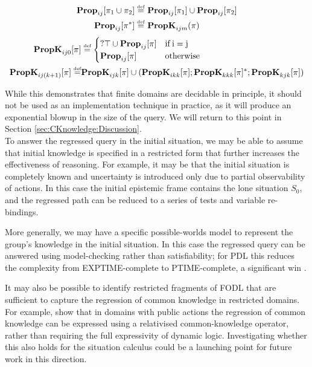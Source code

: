 \begin{align*}
\mathbf{Prop}_{ij}[\pi_{1}\cup\pi_{2}]\stackrel{\mbox{\tiny def}}{=} & \,\,\mathbf{Prop}_{ij}[\pi_{1}]\cup\mathbf{Prop}_{ij}[\pi_{2}]\\
\mathbf{Prop}_{ij}[\pi^{*}]\stackrel{\mbox{\tiny def}}{=} & \,\,\mathbf{PropK}_{ijm}(\pi)\end{align*}
\begin{align*}
\mathbf{PropK}_{ij0}[\pi] & \stackrel{\mbox{\tiny def}}{=}\begin{cases}
?\top\cup\mathbf{Prop}_{ij}[\pi] & \mathrm{if\, i=j}\\
\mathbf{Prop}_{ij}[\pi] & \mathrm{otherwise}\end{cases}\\
\mathbf{PropK}_{ij(k+1)}[\pi]\stackrel{\mbox{\tiny def}}{=} & \mathbf{PropK}_{ijk}[\pi]\cup(\mathbf{PropK}_{ikk}[\pi];\mathbf{PropK}_{kkk}[\pi]^{*};\mathbf{PropK}_{kjk}[\pi])\end{align*}


While this demonstrates that finite domains are decidable in principle,
it should not be used as an implementation technique in practice,
as it will produce an exponential blowup in the size of the query.
We will return to this point in Section \ref{sec:CKnowledge:Discussion}.\\


To answer the regressed query in the initial situation, we may be
able to assume that initial knowledge is specified in a restricted
form that further increases the effectiveness of reasoning. For example,
it may be that the initial situation is completely known and uncertainty
is introduced only due to partial observability of actions. In this
case the initial epistemic frame contains the lone situation $S_{0}$,
and the regressed path can be reduced to a series of tests and variable
re-bindings.

More generally, we may have a specific possible-worlds model to represent
the group's knowledge in the initial situation. In this case the regressed
query can be answered using model-checking rather than satisfiability;
for PDL this reduces the complexity from EXPTIME-complete to PTIME-complete,
a significant win \citep{lange05pdl_model_checking}.

It may also be possible to identify restricted fragments of FODL that
are sufficient to capture the regression of common knowledge in restricted
domains. For example, \citet{vanBenthem06lcc} show that in domains
with public actions the regression of common knowledge can be expressed
using a relativised common-knowledge operator, rather than requiring
the full expressivity of dynamic logic. Investigating whether this
also holds for the situation calculus could be a launching point for
future work in this direction.

